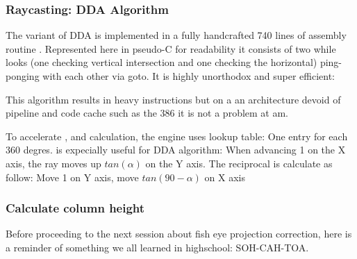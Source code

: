  
 
 
 
 
 
 
 
\subsubsection{Raycasting: DDA Algorithm}
The variant of DDA is implemented in a fully handcrafted 740 lines of assembly routine . Represented here in pseudo-C for readability it consists of two while looks (one checking vertical intersection and one checking the horizontal) ping-ponging with each other via goto. It is highly unorthodox and super efficient:\\
\par



\begin{minipage}{\textwidth}

\end{minipage}
This algorithm results in  heavy instructions but on a an architecture devoid of pipeline and code cache such as the 386 it is not a problem at am.\\
\par
To accelerate ,  and  calculation, the engine uses lookup table: One entry for each 360 degres.  is expecially useful for DDA algorithm: When advancing 1 on the X axis, the ray moves up $tan(\alpha)$ on the Y axis. The reciprocal is calculate as follow: Move 1 on Y axis, move $tan(90-\alpha)$ on X axis

\par
\begin{figure}[H]
\centering
 
\end{figure}



















\subsubsection{Calculate column height}
Before proceeding to the next session about fish eye projection correction, here is a reminder of something we all learned in highschool: SOH-CAH-TOA.

